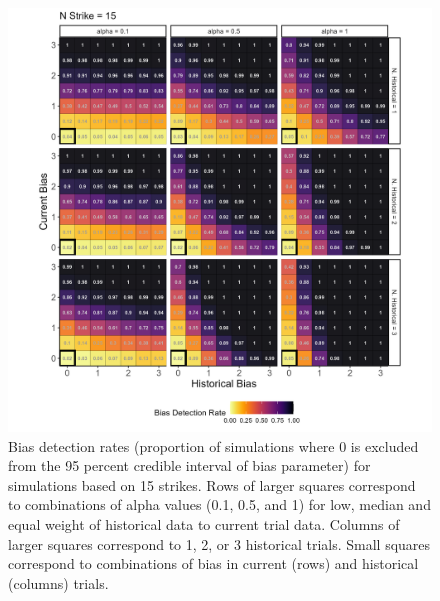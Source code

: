 \documentclass[12pt]{article}
\begin{document}
\begin{figure}

{\centering \includegraphics[width=0.95\linewidth]{../figures/pp15_95CI} 

}

\caption{Bias detection rates (proportion of simulations where 0 is excluded from the 95 percent credible interval of bias parameter) for simulations based on 15 strikes. Rows of larger squares correspond to combinations of alpha values (0.1, 0.5, and 1) for low, median and equal weight of historical data to current trial data. Columns of larger squares correspond to 1, 2, or 3 historical trials. Small squares correspond to combinations of bias in current (rows) and historical (columns) trials.}\label{fig:figbd9515}
\end{figure}
\end{document}
